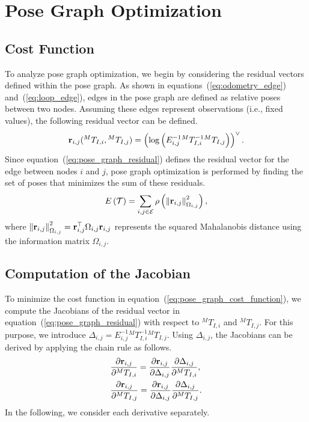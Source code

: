 \section{Pose Graph Optimization}

\subsection{Cost Function}

To analyze pose graph optimization, we begin by considering the residual vectors defined within the pose graph.
As shown in equations~(\ref{eq:odometry_edge}) and~(\ref{eq:loop_edge}), edges in the pose graph are defined as relative poses between two nodes.
Assuming these edges represent observations (i.e., fixed values), the following residual vector can be defined.
%
\begin{align}
  {\bf r}_{i, j}({}^{M}T_{I, i}, {}^{M}T_{I, j}) = \left( \log \left( E_{i, j}^{-1} {}^{M}T_{I, i}^{-1} {}^{M}T_{I, j} \right) \right)^{\vee}.
  \label{eq:pose_graph_residual}
\end{align}
%
Since equation~(\ref{eq:pose_graph_residual}) defines the residual vector for the edge between nodes $i$ and $j$, pose graph optimization is performed by finding the set of poses that minimizes the sum of these residuals.
%
\begin{align}
 E \left( \mathcal{T} \right) = \sum_{ i, j \in \mathcal{E} } \rho \left( \left\| {\bf r}_{i, j} \right\|_{ \Omega_{i, j} }^{2} \right),
  \label{eq:pose_graph_cost_function}
\end{align}
%
where $\left\| {\bf r}_{i, j} \right\|_{ \Omega_{i, j} }^{2} = {\bf r}_{i, j}^{\top} \Omega_{i, j} {\bf r}_{i, j}$ represents the squared Mahalanobis distance using the information matrix $\Omega_{i, j}$.





\subsection{Computation of the Jacobian}

To minimize the cost function in equation~(\ref{eq:pose_graph_cost_function}), we compute the Jacobians of the residual vector in equation~(\ref{eq:pose_graph_residual}) with respect to ${}^{M}T_{I, i}$ and ${}^{M}T_{I, j}$.
For this purpose, we introduce $\Delta_{i, j} = E_{i, j}^{-1} {}^{M}T_{I, i}^{-1} {}^{M}T_{I, j}$.
Using $\Delta_{i, j}$, the Jacobians can be derived by applying the chain rule as follows.
%
\begin{align}
  \begin{split}
    & \frac{ \partial {\bf r}_{i, j} }{ \partial {}^{M}T_{I, i} }
    = \frac{ \partial {\bf r}_{i, j} }{ \partial \Delta_{i, j} }
      \frac{ \partial \Delta_{i, j} }{ \partial {}^{M}T_{I, i} }, \\
%
    & \frac{ \partial {\bf r}_{i, j} }{ \partial {}^{M}T_{I, j} }
    = \frac{ \partial {\bf r}_{i, j} }{ \partial \Delta_{i, j} }
      \frac{ \partial \Delta_{i, j} }{ \partial {}^{M}T_{I, j} }.
  \end{split}
\end{align}
%
In the following, we consider each derivative separately.

